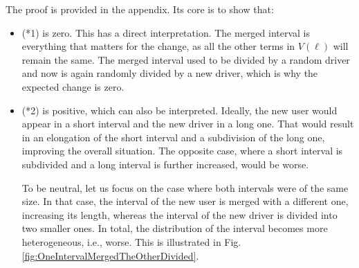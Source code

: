 \documentclass[12pt,english]{article}
\begin{document}
The proof is provided in the appendix. Its core is to show that:
\begin{itemize}
    \item (*1) is zero. This has a direct interpretation. The merged interval is everything that matters for the change, as all the other terms in $V(\ell)$ will remain the same. The merged interval used to be divided by a random driver and now is again randomly divided by a new driver, which is why the expected change is zero.
    \item (*2) is positive, which can also be interpreted. Ideally, the new user would appear in a short interval and the new driver in a long one. That would result in an elongation of the short interval and a subdivision of the long one, improving the overall situation. The opposite case, where a short interval is subdivided and a long interval is further increased, would be worse.
    
    To be neutral, let us focus on the case where both intervals were of the same size. In that case, the interval of the new user is merged with a different one, increasing its length, whereas the interval of the new driver is divided into two smaller ones. In total, the distribution of the interval becomes more heterogeneous, i.e., worse. This is illustrated in Fig. \ref{fig:OneIntervalMergedTheOtherDivided}.

    
\begin{figure}[ht]
\centering
\end{figure}
\end{itemize}
\end{document}
